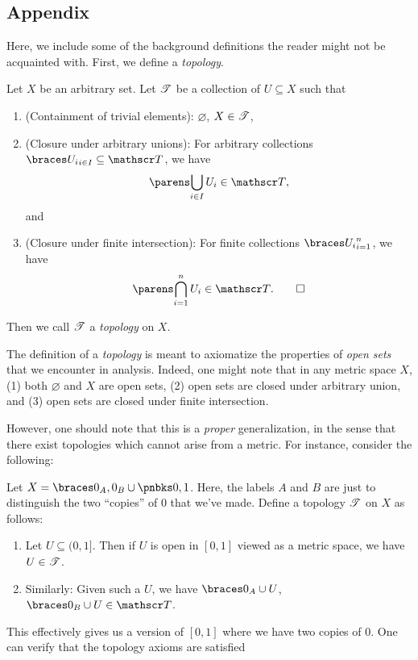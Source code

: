 \documentclass{fkpaper}
\begin{document}
\begin{multicols}{2}
\section{Appendix}
Here, we include some of the background definitions the reader might
not be acquainted with. First, we define a \emph{topology}.
\begin{definition}[Topology]
  Let $X$ be an arbitrary set. Let ${\mathscr{T}}$ be a collection of $U
  \subseteq X$ such that
  \begin{enumerate}
    \item (Containment of trivial elements): $\varnothing$, $X \in {\mathscr{T}}$,
    \item (Closure under arbitrary unions): For arbitrary collections
      $\set{U_i}_{i \in I} \subseteq \ms T$, we have
      \[
      \pn{\bigcup_{i \in I} U_i } \in \ms T,
      \]
      and
    \item (Closure under finite intersection): For finite collections
      $\set{U_i}_{i = 1}^n$, we have
      \[
      \pn{\bigcap_{i=1}^n U_i} \in \ms T. \qedhere
      \]
  \end{enumerate}
  Then we call ${\mathscr{T}}$ a \emph{topology} on $X$.
\end{definition}
The definition of a \emph{topology} is meant to axiomatize the
properties of \emph{open sets} that we encounter in analysis. Indeed,
one might note that in any metric space $X$, (1) both $\varnothing$
and $X$ are open sets, (2) open sets are closed under arbitrary union,
and (3) open sets are closed under finite intersection.

However, one should note that this is a \emph{proper} generalization,
in the sense that there exist topologies which cannot arise from a
metric. For instance, consider the following:
\begin{example}
  Let $X = \set{0_{A}, 0_{B}} \cup \pb{0, 1}$. Here, the labels $A$
  and $B$ are just to distinguish the two ``copies'' of $0$ that we've
  made. Define a topology ${\mathscr{T}}$ on $X$ as follows:
  \begin{enumerate}
    \item Let $U \subseteq (0,1]$. Then if $U$ is open in $[0,1]$
      viewed as a metric space, we have $U \in {\mathscr{T}}$.
    \item Similarly: Given such a $U$, we have $\set{0_A} \cup U$,
      $\set{0_B} \cup U \in \ms T$. \qedhere
  \end{enumerate}
\end{example}
This effectively gives us a version of $[0,1]$ where we have two
copies of $0$. One can verify that the topology axioms are satisfied


\end{multicols}
\end{document}
